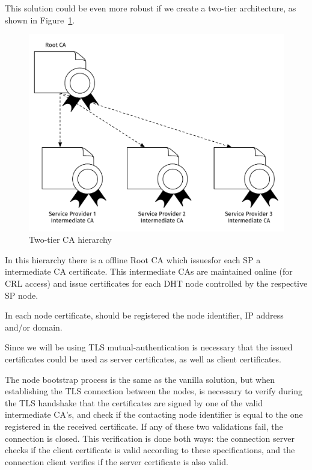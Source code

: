 
This solution could be even more robust if we create a two-tier architecture, as shown in Figure~\ref{fig:ca-hierarchy}.

\begin{figure}
  \centering
  \includegraphics[scale=0.7]{Figures/architecture-ca-hierarchy.pdf}
  \caption{Two-tier \acl{CA} hierarchy}
\label{fig:ca-hierarchy}
\end{figure}

In this hierarchy there is a offline Root CA which issuesfor each \ac{SP} a intermediate CA certificate.
This intermediate CAs are maintained online (for \ac{CRL} access) and issue certificates for each DHT node controlled by the respective \ac{SP} node.

In each node certificate, should be registered the node identifier, IP address and/or domain.

Since we will be using TLS mutual-authentication is necessary that the issued certificates could be used as server certificates, as well as client certificates.

The node bootstrap process is the same as the vanilla solution, but when establishing the TLS connection between the nodes, is necessary to verify during the TLS handshake that the certificates are signed by one of the valid intermediate CA's, and check if the contacting node identifier is equal to the one registered in the received certificate.
If any of these two validations fail, the connection is closed.
This verification is done both ways: the connection server checks if the client certificate is valid according to these specifications, and the connection client verifies if the server certificate is also valid.

